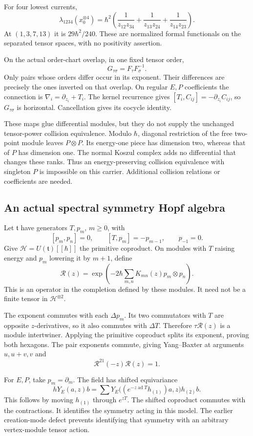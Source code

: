 For four lowest currents,
\[
 \lambda_{1234}(x_0^{\otimes4})
 =\hbar^2\left(
 \frac1{z_{12}z_{34}}+\frac1{z_{13}z_{24}}+
 \frac1{z_{14}z_{23}}\right).
\]
At $(1,3,7,13)$ it is $29\hbar^2/240$.
These are normalized formal functionals on the separated
tensor spaces, with no positivity assertion.

On the actual order-chart overlap, in one fixed tensor order,
\[
 G_{\tau\sigma}=F_\tau F_\sigma^{-1}.
\]
Only pairs whose orders differ occur in its exponent.
Their differences are precisely the ones inverted
on that overlap. On regular $E,P$ coefficients the connection
is $\nabla_i=\partial_{z_i}+T_i$.
The kernel recurrence gives
$[T_i,C_{ij}]=-\partial_{z_i}C_{ij}$, so $G_{\tau\sigma}$
is horizontal. Cancellation gives its cocycle identity.

These maps glue differential modules, but they do not
supply the unchanged tensor-power collision equivalence.
Modulo $\hbar$, diagonal restriction of the free
two-point module leaves $P\otimes P$.
Its energy-one piece has dimension two, whereas that of
$P$ has dimension one. The normal Koszul complex adds
no differential that changes these ranks.
Thus an energy-preserving collision equivalence with
singleton $P$ is impossible on this carrier.
Additional collision relations or coefficients are needed.

\subsection{An actual spectral symmetry Hopf algebra}

Let $\mathfrak t$ have generators $T,p_m$, $m\geq0$, with
\[
 [p_m,p_n]=0,\qquad [T,p_m]=-p_{m-1},\qquad p_{-1}=0.
\]
Give $\mathscr H=U(\mathfrak t)[[\hbar]]$ the primitive
coproduct. On modules with $T$ raising energy and $p_m$
lowering it by $m+1$, define
\[
 \mathcal R(z)=
 \exp\left(-2\hbar\sum_{m,n}K_{mn}(z)p_m\otimes p_n\right).
\]
This is an operator in the completion defined by these
modules. It need not be a finite tensor in $\mathscr H^{\otimes2}$.

The exponent commutes with each $\Delta p_m$.
Its two commutators with $T$ are opposite $z$-derivatives,
so it also commutes with $\Delta T$.
Therefore $\tau\mathcal R(z)$ is a module intertwiner.
Applying the primitive coproduct splits its exponent,
proving both hexagons. The pair exponents commute, giving
Yang--Baxter at arguments $u,u+v,v$ and
\[
 \mathcal R^{21}(-z)\mathcal R(z)=1.
\]

For $E,P$, take $p_m=\partial_m$.
The field has shifted equivariance
\[
 hY_E(a,z)b
 =\sum Y_E\bigl((e^{-z\operatorname{ad}T}h_{(1)})a,z\bigr)
             h_{(2)}b.
\]
This follows by moving $h_{(1)}$ through $e^{zT}$.
The shifted coproduct commutes with the contractions.
It identifies the symmetry acting in this model.
The earlier creation-mode defect prevents identifying
that symmetry with an arbitrary vertex-module tensor action.

